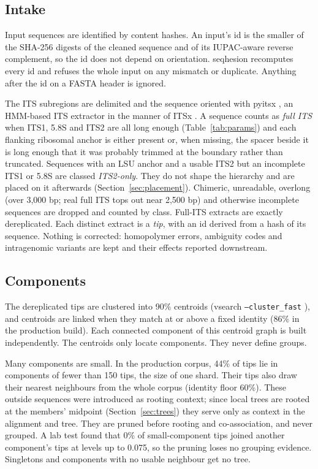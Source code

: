 \documentclass[11pt,a4paper]{article}
\newcommand{\seqhesion}{\textsf{seqhesion}}
\begin{document}
\subsection{Intake}\label{sec:intake}

Input sequences are identified by content hashes. An input's id is the smaller of the SHA-256
digests of the cleaned sequence and of its IUPAC-aware reverse complement, so the id does not
depend on orientation. \seqhesion{} recomputes every id and refuses the whole input on any mismatch
or duplicate. Anything after the id on a FASTA header is ignored.

The ITS subregions are delimited and the sequence oriented with pyitsx \citep{walker2026pyitsx}, an
HMM-based ITS extractor in the manner of ITSx \citep{bengtsson2013itsx}. A sequence counts as \emph{full ITS} when ITS1,
5.8S and ITS2 are all long enough (Table~\ref{tab:params}) and each flanking ribosomal anchor is
either present or, when missing, the spacer beside it is long enough that it was probably trimmed
at the boundary rather than truncated. Sequences with an LSU anchor and a usable ITS2 but an
incomplete ITS1 or 5.8S are classed \emph{ITS2-only}. They do not shape the hierarchy and are placed
on it afterwards (Section~\ref{sec:placement}). Chimeric, unreadable, overlong (over 3{,}000 bp;
real full ITS tops out near 2{,}500 bp) and otherwise incomplete sequences are dropped and counted
by class. Full-ITS extracts are exactly dereplicated. Each distinct extract is a \emph{tip}, with an
id derived from a hash of its sequence. Nothing is corrected: homopolymer errors, ambiguity codes
and intragenomic variants are kept and their effects reported downstream.

\subsection{Components}\label{sec:components}

The dereplicated tips are clustered into 90\% centroids (vsearch \texttt{--cluster\_fast}
\citep{rognes2016vsearch}), and centroids are linked when they match at or above a fixed identity
(86\% in the production build). Each connected component of this centroid graph is built
independently. The centroids only locate components. They never define groups.

Many components are small. In the production corpus, 44\% of tips lie in components of fewer than
150 tips, the size of one shard. Their tips also draw their nearest neighbours from the whole
corpus (identity floor 60\%). These outside sequences were introduced as rooting context; since
local trees are rooted at the members' midpoint (Section~\ref{sec:trees}) they serve only as
context in the alignment and tree. They are pruned before rooting and co-association, and never
grouped. A lab test found that 0\% of small-component tips
joined another component's tips at levels up to 0.075, so the pruning loses no grouping evidence.
Singletons and components with no usable neighbour get no tree.
\end{document}
